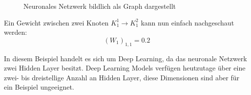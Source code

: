 \documentclass[12pt,letterpaper,ngerman]{article}
\begin{document}
\begin{example}
\begin{figure}[H]
\begin{center}
      \caption{ Neuronales Netzwerk bildlich als Graph dargestellt}
    \end{center}
  \end{figure}
  Ein Gewicht zwischen zwei Knoten $K_1^1 \to K_1^2$ kann nun einfach nachgeschaut werden:
  \[
    (W_1)_{1,1} = 0.2
  \]
\end{example}
\pagebreak
In diesem Beispiel handelt es sich um Deep Learning, da das neuronale Netzwerk 
zwei Hidden Layer besitzt. Deep Learning Models verfügen heutzutage über
eine zwei- bis dreistellige Anzahl an Hidden Layer, diese Dimensionen sind 
aber für ein Beispiel ungeeignet.
\end{document}
